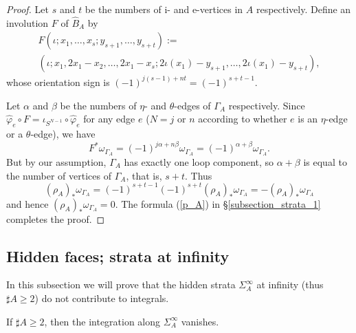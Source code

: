 \begin{proof}
Let $s$ and $t$ be the numbers of i- and e-vertices in $A$ respectively.
Define an involution $F$ of $\hat{B}_A$ by
\begin{multline*}
 F(\iota ; x_1 ,\dots ,x_s ; y_{s+1} ,\dots ,y_{s+t}) := \\
 (\iota ; x_1 ,2x_1 -x_2 ,\dots ,2x_1 -x_s ;2\iota (x_1 )-y_{s+1},\dots ,2\iota (x_1 )-y_{s+t}),
\end{multline*}
whose orientation sign is $(-1)^{j(s-1)+nt}=(-1)^{s+t-1}$.


Let $\alpha$ and $\beta$ be the numbers of $\eta$- and $\theta$-edges of $\Gamma_A$ respectively.
Since $\hat{\varphi}_e \circ F =\iota_{S^{N-1}}\circ \hat{\varphi}_e$ for any edge $e$ ($N=j$ or $n$ according to whether
$e$ is an $\eta$-edge or a $\theta$-edge), we have
\[
 F^* \omega_{\Gamma_A} =(-1)^{j\alpha + n\beta} \omega_{\Gamma_A} =(-1)^{\alpha + \beta}\omega_{\Gamma_A}.
\]
But by our assumption, $\Gamma_A$ has exactly one loop component, so $\alpha+ \beta$ is equal to the number of
vertices of $\Gamma_A$, that is, $s+t$.
Thus
\[
 (\rho_A )_* \omega_{\Gamma_A} = (-1)^{s+t-1}(-1)^{s+t}(\rho_A )_* \omega_{\Gamma_A} =-(\rho_A )_* \omega_{\Gamma_A}
\]
and hence $(\rho_A )_* \omega_{\Gamma_A} = 0$.
The formula (\ref{p_A}) in \S \ref{subsection_strata_1} completes the proof.
\end{proof}





\subsection{Hidden faces; strata at infinity}\label{subsection_hidden_infty}


In this subsection we will prove that the hidden strata $\Sigma^{\infty}_A$ at infinity (thus $\sharp A \ge 2$)
do not contribute to integrals.


\begin{lem}\label{lem_tree_infty}
If $\sharp A \ge 2$, then the integration along $\Sigma^{\infty}_A$ vanishes.
\end{lem}


